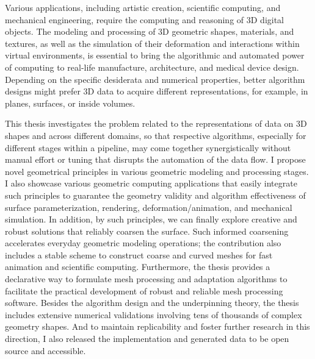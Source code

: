 Various applications, including artistic creation, scientific computing, and mechanical engineering, require the computing and reasoning of 3D digital objects.
The modeling and processing of 3D geometric shapes, materials, and textures, as well as the simulation of their deformation and interactions within virtual environments, is essential to bring the algorithmic and automated power of computing to real-life manufacture, architecture, and medical device design.
Depending on the specific desiderata and numerical properties, better algorithm designs might prefer 3D data to acquire different representations, for example, in planes, surfaces, or inside volumes.

This thesis investigates the problem related to the representations of data on 3D shapes and across different domains,
so that respective algorithms, especially for different stages within a pipeline, may come together synergistically without manual effort or tuning that disrupts the automation of the data flow.
I propose novel geometrical principles in various geometric modeling and processing stages. 
I also showcase various geometric computing applications that easily integrate such principles to guarantee the geometry validity and algorithm effectiveness of surface parameterization, rendering, deformation/animation, and mechanical simulation.
In addition, by such principles, we can finally explore creative and robust solutions that reliably coarsen the surface. Such informed coarsening accelerates everyday geometric modeling operations; the contribution also includes a stable scheme to construct coarse and curved meshes for fast animation and scientific computing.
Furthermore, the thesis provides a declarative way to formulate mesh processing and adaptation algorithms to facilitate the practical development of robust and reliable mesh processing software.
Besides the algorithm design and the underpinning theory, the thesis includes extensive numerical validations involving tens of thousands of complex geometry shapes. And to maintain replicability and foster further research in this direction, I also released the implementation and generated data to be open source and accessible.
